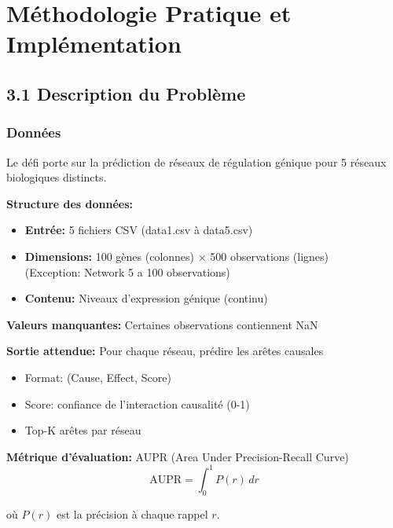 \documentclass[12pt,a4paper,french]{article}
\begin{document}
\newpage


\section{Méthodologie Pratique et Implémentation}

\subsection{3.1 Description du Problème}

\subsubsection{Données}

Le défi porte sur la prédiction de réseaux de régulation génique pour 5 réseaux biologiques distincts.

\textbf{Structure des données:}
\begin{itemize}
    \item \textbf{Entrée:} 5 fichiers CSV (data1.csv à data5.csv)
    \item \textbf{Dimensions:} 100 gènes (colonnes) $\times$ 500 observations (lignes)
        \\ (Exception: Network 5 a 100 observations)
    \item \textbf{Contenu:} Niveaux d'expression génique (continu)
\end{itemize}

\textbf{Valeurs manquantes:} Certaines observations contiennent NaN

\textbf{Sortie attendue:} Pour chaque réseau, prédire les arêtes causales
\begin{itemize}
    \item Format: (Cause, Effect, Score)
    \item Score: confiance de l'interaction causalité (0-1)
    \item Top-K arêtes par réseau
\end{itemize}

\textbf{Métrique d'évaluation:} AUPR (Area Under Precision-Recall Curve)
\begin{equation}
\text{AUPR} = \int_0^1 P(r) \, dr
\end{equation}

où $P(r)$ est la précision à chaque rappel $r$.
\end{document}

